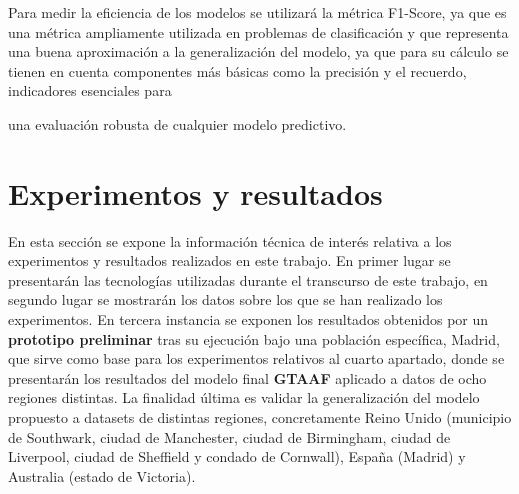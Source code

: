 \documentclass{uathesis-es}
\begin{document}
Para medir la eficiencia de los modelos se utilizará la métrica F1-Score, ya que es una métrica ampliamente utilizada en problemas de clasificación y que representa una buena aproximación a la generalización del modelo, ya que para su cálculo se tienen en cuenta componentes más básicas como la precisión y el recuerdo, indicadores esenciales para {una evaluación robusta de cualquier modelo predictivo.


\chapter{Experimentos y resultados}

En esta sección se expone la información técnica de interés relativa a los experimentos y resultados realizados en este trabajo. En primer lugar se presentarán las tecnologías utilizadas durante el transcurso de este trabajo, en segundo lugar se mostrarán los datos sobre los que se han realizado los experimentos. En tercera instancia se exponen los resultados obtenidos por un \textbf{prototipo preliminar} tras su ejecución bajo una población específica, Madrid, que sirve como base para los experimentos relativos al cuarto apartado, donde se presentarán los resultados del modelo final \textbf{GTAAF} aplicado a datos de ocho regiones distintas. La finalidad última es validar la generalización del modelo propuesto a datasets de distintas regiones, concretamente Reino Unido (municipio de Southwark, ciudad de Manchester, ciudad de Birmingham, ciudad de Liverpool, ciudad de Sheffield y condado de Cornwall), España (Madrid) y Australia (estado de Victoria).






}
\end{document}
